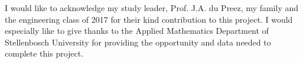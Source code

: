 

\begin{acknowledgements}      %
I would like to acknowledge my study leader, Prof. J.A. du Preez, my family and the engineering class of 2017 for their kind contribution to this project. I would especially like to give thanks to the Applied Mathematics Department of Stellenbosch University for providing the opportunity and data needed to complete this project.
\end{acknowledgements}
